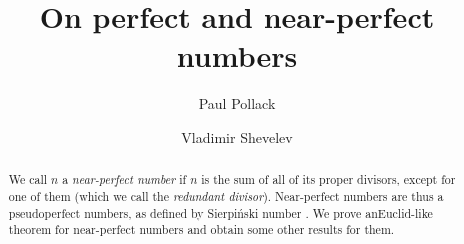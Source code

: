 \documentclass[12pt]{amsart}
\numberwithin{equation}{section}
\begin{document}

\title[On perfect and near-perfect numbers]{On perfect and near-perfect numbers}
\author{Paul Pollack}
\address{University of British Columbia\\Department of Mathematics\\1984 Mathematics Road\\Vancouver, BC V6T 1Z2 Canada}

\author{Vladimir Shevelev}
\address{Department of Mathematics \\Ben-Gurion University of the
 Negev\\Beer-Sheva 84105, Israel}

\begin{abstract}
We call $n$ a \emph{near-perfect number} if $n$ is the sum of all of its proper divisors, except for one of them (which we call the \emph{redundant divisor}). Near-perfect numbers are thus a  pseudoperfect numbers, as defined by Sierpi\'{n}ski number \cite{1}. We prove anEuclid-like theorem for near-perfect numbers and obtain some other results for them.
\end{abstract}

\maketitle
\end{document}
